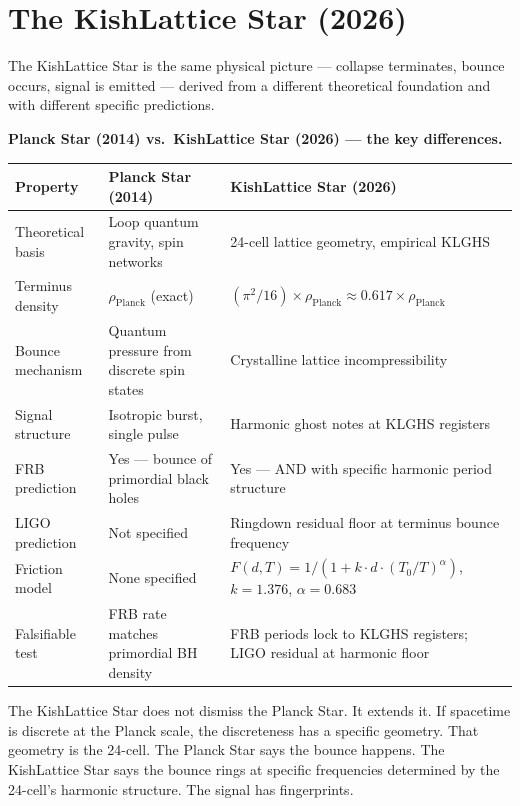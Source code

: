 \documentclass[11pt, letterpaper, openany]{book}
\begin{document}
\section{The KishLattice Star (2026)}

The KishLattice Star is the same physical picture --- collapse terminates,
bounce occurs, signal is emitted --- derived from a different theoretical
foundation and with different specific predictions.

\begin{competitionbox}
\textbf{Planck Star (2014) vs.\ KishLattice Star (2026) --- the key differences.}

\vspace{0.5em}
\begin{tabular}{|p{3.5cm}|p{5.0cm}|p{5.0cm}|}
\hline
\rowcolor{kishblue!10}
\textbf{Property} & \textbf{Planck Star (2014)} & \textbf{KishLattice Star (2026)} \\
\hline\hline
Theoretical basis & Loop quantum gravity, spin networks & 24-cell lattice geometry, empirical KLGHS \\
\hline
Terminus density & $\rho_\text{Planck}$ (exact) & $(\pi^2/16) \times \rho_\text{Planck} \approx 0.617 \times \rho_\text{Planck}$ \\
\hline
Bounce mechanism & Quantum pressure from discrete spin states & Crystalline lattice incompressibility \\
\hline
Signal structure & Isotropic burst, single pulse & Harmonic ghost notes at KLGHS registers \\
\hline
FRB prediction & Yes --- bounce of primordial black holes & Yes --- AND with specific harmonic period structure \\
\hline
LIGO prediction & Not specified & Ringdown residual floor at terminus bounce frequency \\
\hline
Friction model & None specified & $F(d,T) = 1/(1 + k \cdot d \cdot (T_0/T)^\alpha)$, $k=1.376$, $\alpha=0.683$ \\
\hline
Falsifiable test & FRB rate matches primordial BH density & FRB periods lock to KLGHS registers; LIGO residual at harmonic floor \\
\hline
\end{tabular}
\end{competitionbox}

The KishLattice Star does not dismiss the Planck Star. It extends it.
If spacetime is discrete at the Planck scale, the discreteness has a specific
geometry. That geometry is the 24-cell. The Planck Star says the bounce
happens. The KishLattice Star says the bounce rings at specific frequencies
determined by the 24-cell's harmonic structure. The signal has fingerprints.
\end{document}
